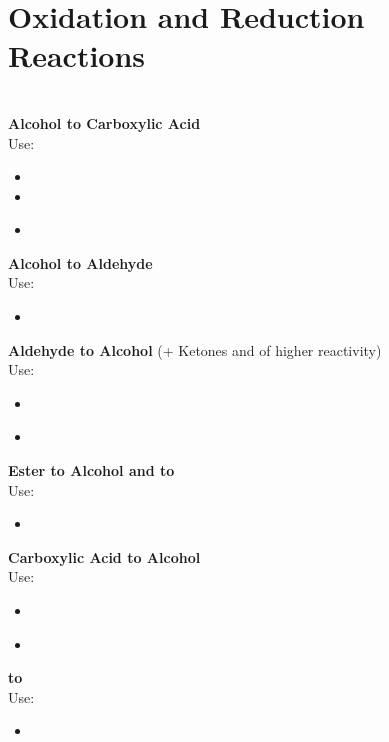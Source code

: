 \section{Oxidation and Reduction Reactions}
\hfill \\

\textbf{Alcohol to Carboxylic Acid} ~~~~~~~~~~~~~ \\
Use:
\begin{itemize}
  \item {}
  \item {}
  \item {}\\
\end{itemize}

\textbf{Alcohol to Aldehyde} ~~~~~~~~~~~~~ \\
Use:
\begin{itemize}
  \item {}\\
\end{itemize}

\textbf{Aldehyde to Alcohol} (+ Ketones and  of higher reactivity)
~~~~~~~~~~~~~ \\
Use:
\begin{itemize}
  \item {}
  \item {}\\
\end{itemize}

\textbf{Ester to Alcohol and  to }
~~~~~~~~~~~~~ \\
Use:
\begin{itemize}
  \item {}\\
\end{itemize}

\textbf{Carboxylic Acid to Alcohol} ~~~~~~~~~~~~~ \\
Use:
\begin{itemize}
  \item {}
  \item {}\\
\end{itemize}

\textbf{ to } ~~~~~~~~~~~~~ \\
Use:
\begin{itemize}
  \item {}\\
\end{itemize}

